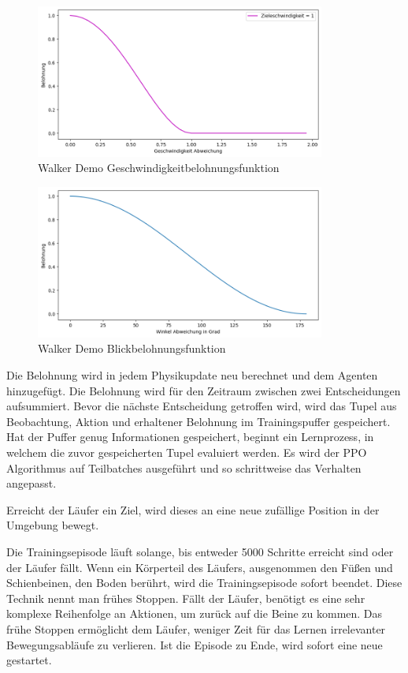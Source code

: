 \begin{figure}[H]
  \centering  
  \includegraphics[width=0.85\textwidth]{img/plot_demo_vel_1}
  \caption{Walker Demo Geschwindigkeitbelohnungsfunktion}
  \label{fig:plot_demo_vel_1}
\end{figure}

\begin{figure}[H]
  \centering  
  \includegraphics[width=0.85\textwidth]{img/plot_demo_look}
  \caption{Walker Demo Blickbelohnungsfunktion}
  \label{fig:plot_demo_look}
\end{figure}

Die Belohnung wird in jedem Physikupdate neu berechnet und dem Agenten hinzugefügt. Die Belohnung wird für den Zeitraum zwischen zwei Entscheidungen aufsummiert. Bevor die nächste Entscheidung getroffen wird, wird das Tupel aus Beobachtung, Aktion und erhaltener Belohnung im Trainingspuffer gespeichert. Hat der Puffer genug Informationen gespeichert, beginnt ein Lernprozess, in welchem die zuvor gespeicherten Tupel evaluiert werden. Es wird der PPO Algorithmus auf Teilbatches ausgeführt und so schrittweise das Verhalten angepasst.

Erreicht der Läufer ein Ziel, wird dieses an eine neue zufällige Position in der Umgebung bewegt.

Die Trainingsepisode läuft solange, bis entweder 5000 Schritte erreicht sind oder der Läufer fällt. Wenn ein Körperteil des Läufers, ausgenommen den Füßen und Schienbeinen, den Boden berührt, wird die Trainingsepisode sofort beendet. Diese Technik nennt man \grqq{}frühes Stoppen\grqq{}. Fällt der Läufer, benötigt es eine sehr komplexe Reihenfolge an Aktionen, um zurück auf die Beine zu kommen. Das frühe Stoppen ermöglicht dem Läufer, weniger Zeit für das Lernen irrelevanter Bewegungsabläufe zu verlieren. Ist die Episode zu Ende, wird sofort eine neue gestartet.

